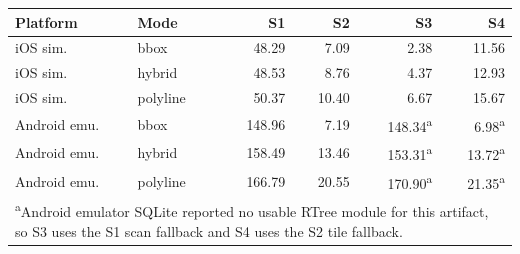 \begin{tabular}{llrrrr}
\toprule
Platform & Mode & S1 & S2 & S3 & S4 \\
\midrule
iOS sim. & bbox & 48.29 & 7.09 & 2.38 & 11.56 \\
iOS sim. & hybrid & 48.53 & 8.76 & 4.37 & 12.93 \\
iOS sim. & polyline & 50.37 & 10.40 & 6.67 & 15.67 \\
Android emu. & bbox & 148.96 & 7.19 & 148.34\textsuperscript{a} & 6.98\textsuperscript{a} \\
Android emu. & hybrid & 158.49 & 13.46 & 153.31\textsuperscript{a} & 13.72\textsuperscript{a} \\
Android emu. & polyline & 166.79 & 20.55 & 170.90\textsuperscript{a} & 21.35\textsuperscript{a} \\
\multicolumn{6}{p{7.3cm}}{\textsuperscript{a}Android emulator SQLite reported no usable RTree module for this artifact, so S3 uses the S1 scan fallback and S4 uses the S2 tile fallback.}\\
\bottomrule
\end{tabular}
